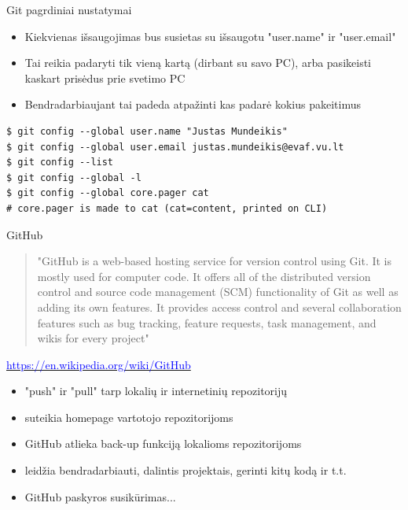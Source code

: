 \documentclass[11pt,xcolor=table]{beamer}
\begin{document}
\begin{frame}[fragile]{Git pagrdiniai nustatymai}
\begin{itemize}
\item Kiekvienas išsaugojimas bus susietas su išsaugotu "user.name" ir "user.email"
\item Tai reikia padaryti tik vieną kartą (dirbant su savo PC), arba pasikeisti kaskart prisėdus prie svetimo PC
\item Bendradarbiaujant tai padeda atpažinti kas padarė kokius pakeitimus
\end{itemize}
\begin{lstlisting}
$ git config --global user.name "Justas Mundeikis"
$ git config --global user.email justas.mundeikis@evaf.vu.lt
$ git config --list
$ git config --global -l
$ git config --global core.pager cat 
# core.pager is made to cat (cat=content, printed on CLI)
\end{lstlisting}
\end{frame}
\begin{frame}{GitHub}
\begin{quote}
"GitHub  is a web-based hosting service for version control using Git. It is mostly used for computer code. It offers all of the distributed version control and source code management (SCM) functionality of Git as well as adding its own features. It provides access control and several collaboration features such as bug tracking, feature requests, task management, and wikis for every project"
\end{quote}
\href{https://en.wikipedia.org/wiki/GitHub}{\textcolor{blue}{https://en.wikipedia.org/wiki/GitHub}}

\begin{itemize}
\item "push" ir "pull" tarp lokalių ir internetinių repozitorijų
\item suteikia homepage vartotojo repozitorijoms
\item GitHub atlieka back-up funkciją lokalioms repozitorijoms
\item leidžia bendradarbiauti, dalintis projektais, gerinti kitų kodą ir t.t.
\item GitHub paskyros susikūrimas...
\end{itemize}
\end{frame}
\end{document}
